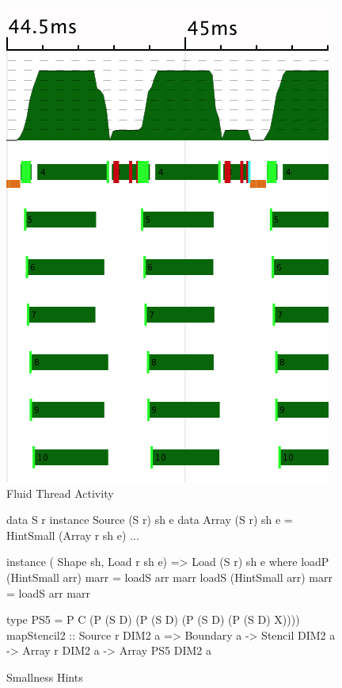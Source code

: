 \begin{figure}
\begin{center}
\includegraphics[scale=0.2]{data/fluid/seq}
\end{center}
\caption{Fluid Thread Activity}
\label{figure:FluidActivity}
\end{figure}

\begin{figure}
\begin{small}
\begin{code}
data S r
instance Source (S r) sh e
 data Array (S r) sh e 
        = HintSmall (Array r sh e)
 ...

instance ( Shape sh, Load r sh e) 
        => Load (S r) sh e where
 loadP (HintSmall arr) marr = loadS arr marr
 loadS (HintSmall arr) marr = loadS arr marr

type PS5 = P C (P (S D) (P (S D) (P (S D) (P (S D) X))))
mapStencil2 :: Source r DIM2 a 
  => Boundary a     -> Stencil DIM2 a
  -> Array r DIM2 a -> Array PS5 DIM2 a
\end{code}
\end{small}
\caption{Smallness Hints}
\label{figure:SmallnessHints}
\end{figure}


